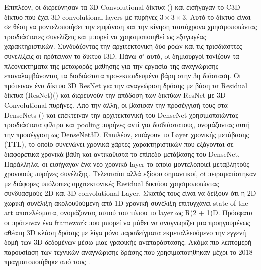 Επιπλέον, οι \en \cite{Tran2014LearningSF} \gr  διερεύνησαν τα \en  3D Convolutional \gr δίκτυα (\en \cite{pmid:22392705}\gr)
και εισήγαγαν το \en  C3D \gr δίκτυο που έχει \en  3D convolutional layers \gr  με πυρήνες $3 \times  3 \times 3$.
Αυτό το δίκτυο είναι σε θέση να μοντελοποιήσει την  εμφάνιση και την κίνηση ταυτόχρονα χρησιμοποιώντας τρισδιάστατες συνελίξεις και μπορεί να χρησιμοποιηθεί ως
εξαγωγέας χαρακτηριστικών. Συνδυάζοντας την αρχιτεκτονική δύο ροών και τις τρισδιάσττες συνελίξεις οι \en\cite{DBLP:journals/corr/CarreiraZ17}  \gr πρότειναν το  δίκτυο \en I3D\gr.
Πάνω σ' αυτό, oι δημιουργοί τονίζουν τα πλεονεκτήματα της μεταφοράς μάθησης για την εργασία της αναγνώρισης επαναλαμβάνοντας τα δισδιάστατα προ-εκπαιδευμένα βάρη στην 3η διάσταση.
Οι \en \cite{DBLP:journals/corr/abs-1708-07632} \gr πρότειναν ένα δίκτυο \en 3D ResNet \gr για την αναγνώριση δράσης με βάση τα \en Residual \gr δίκτυα (\en ResNet)(\cite{DBLP:journals/corr/HeZRS15}\gr)
και διερευνούν την απόδοση  των δικτύων \en ResNet \gr με  \en 3D Convolutional \gr πυρήνες. Από την άλλη, οι \en \cite{DBLP:journals/corr/abs-1711-08200} \gr 
βάσισαν  την προσέγγισή τους στα \en DenseNets (\cite{DBLP:journals/corr/HuangLW16a}) \gr και επέκτειναν την αρχιτεκτονική του \en DenseNet \gr χρησιμοποιώντας τρισδιάστατα φίλτρα
και \en pooling \gr πυρήνες αντί για δισδιάστατους, ονομάζοντας αυτή την προσέγγιση ως \en DenseNet3D\gr. Επιπλέον, εισάγουν το \en Layer \gr χρονικής μετάβασης \en(TTL)\gr,
το οποίο συνενώνει χρονικά χάρτες χαρακτηριστικών που εξάγονται  σε διαφορετικά  χρονικά βάθη και αντικαθιστά το επίπεδο μετάβασης του \en  DenseNet\gr.
Παράλληλα, οι \en \cite{DBLP:DibaFSKAYG18} \gr εισήγαγαν  ένα νέο χρονικό \en layer \gr το οποίο μοντελοποιεί  μεταβλητούς χρονικούς  πυρήνες συνέλιξης. Τελευταίοι αλλά εξίσου σημαντικοί, 
oi \en \cite{DBLP:journals/corr/abs-1711-11248} \gr  πειραματίστηκαν  με διάφορες υπόλοιπες αρχιτεκτονικές \en Residual \gr δικτύου χρησιμοποιώντας
συνδυασμούς \en 2D  \gr και \en 3D convolutional Layer\gr. Σκοπός τους είναι να δείξουν ότι η \en 2D \gr χωρική συνέλιξη ακολουθούμενη από \en 1D \gr χρονική  συνέλιξη επιτυγχάνει \en state-of-the-art \gr
αποτελέσματα, ονομάζοντας αυτού του τύπου το \en layer \gr ως \en R(2 + 1)D\gr. Πρόσφατα οι \en \cite{Guo_2018_ECCV} \gr  πρότειναν ένα \en framework \gr  που μπορεί να μάθει να
 αναγνωρίζει μια προηγουμένως αθέατη \en 3D \gr κλάση δράσης  με λίγα μόνο παραδείγματα εκμεταλλευόμενο την εγγενή δομή των \en 3D \gr δεδομένων μέσω μιας γραφικής αναπαράστασης.
Ακόμα πιο λεπτομερή  παρουσίαση των τεχνικών αναγνώρισης δράσης που χρησιμοποιήθηκαν μέχρι το 2018 πραγματοποιήθηκε από τους \en\cite{DBLP:journals/corr/abs-1806-11230}\gr.

